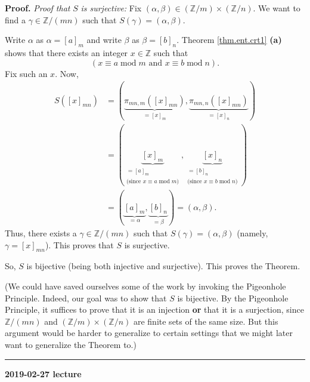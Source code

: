 \documentclass[numbers=enddot,12pt,final,onecolumn,notitlepage]{scrartcl}%
\numberwithin{exer}{subsection}
\theoremstyle{definition}
\newenvironment{proof}[1][Proof]{\noindent\textbf{#1.} }{\ \rule{0.5em}{0.5em}}
\begin{document}
\begin{proof}
\textit{Proof that }$S$ \textit{is surjective:} Fix $\left(  \alpha
,\beta\right)  \in\left(  \mathbb{Z}/m\right)  \times\left(  \mathbb{Z}%
/n\right)  $. We want to find a $\gamma\in\mathbb{Z}/\left(  mn\right)  $ such
that $S\left(  \gamma\right)  =\left(  \alpha,\beta\right)  $.

Write $\alpha$ as $\alpha=\left[  a\right]  _{m}$ and write $\beta$ as
$\beta=\left[  b\right]  _{n}$. Theorem \ref{thm.ent.crt1} \textbf{(a)} shows
that there exists an integer $x\in\mathbb{Z}$ such that%
\[
\left(  x\equiv a\operatorname{mod}m\text{ and }x\equiv b\operatorname{mod}%
n\right)  .
\]
Fix such an $x$. Now,
\begin{align*}
S\left(  \left[  x\right]  _{mn}\right)   &  =\left(  \underbrace{\pi
_{mn,m}\left(  \left[  x\right]  _{mn}\right)  }_{=\left[  x\right]  _{m}%
},\underbrace{\pi_{mn,n}\left(  \left[  x\right]  _{mn}\right)  }_{=\left[
x\right]  _{n}}\right) \\
&  =\left(  \underbrace{\left[  x\right]  _{m}}_{\substack{=\left[  a\right]
_{m}\\\text{(since }x\equiv a\operatorname{mod}m\text{)}}},\underbrace{\left[
x\right]  _{n}}_{\substack{=\left[  b\right]  _{n}\\\text{(since }x\equiv
b\operatorname{mod}n\text{)}}}\right) \\
&  =\left(  \underbrace{\left[  a\right]  _{m}}_{=\alpha},\underbrace{\left[
b\right]  _{n}}_{=\beta}\right)  =\left(  \alpha,\beta\right)  .
\end{align*}
Thus, there exists a $\gamma\in\mathbb{Z}/\left(  mn\right)  $ such that
$S\left(  \gamma\right)  =\left(  \alpha,\beta\right)  $ (namely,
$\gamma=\left[  x\right]  _{mn}$). This proves that $S$ is surjective.

So, $S$ is bijective (being both injective and surjective). This proves the Theorem.

(We could have saved ourselves some of the work by invoking the Pigeonhole
Principle. Indeed, our goal was to show that $S$ is bijective. By the
Pigeonhole Principle, it suffices to prove that it is an injection \textbf{or}
that it is a surjection, since $\mathbb{Z}/\left(  mn\right)  $ and $\left(
\mathbb{Z}/m\right)  \times\left(  \mathbb{Z}/n\right)  $ are finite sets of
the same size. But this argument would be harder to generalize to certain
settings that we might later want to generalize the Theorem to.)
\end{proof}

\begin{center}
\textbf{2019-02-27 lecture}
\end{center}
\end{document}
